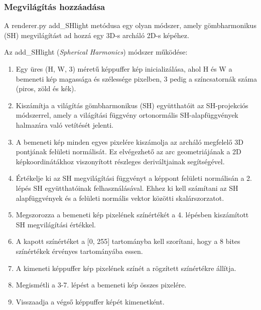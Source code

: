 \documentclass[12pt,a4]{article}
\begin{document}
\subsubsection{Megvilágítás hozzáadása}
A renderer.py add\_SHlight metódusa egy olyan módszer, amely gömbharmonikus (SH) megvilágítást ad hozzá egy 3D-s archáló 2D-s képéhez.

Az add\_SHlight (\textit{Spherical Harmonics}) módszer működése:

\begin{enumerate}
    \item Egy üres (H, W, 3) méretű képpuffer kép inicializálása, ahol H és W a bemeneti kép magassága és szélessége pixelben, 3 pedig a színcsatornák száma (piros, zöld és kék).

    \item Kiszámítja a világítás gömbharmonikus (SH) együtthatóit az SH-projekciós módszerrel, amely a világítási függvény ortonormális SH-alapfüggvények halmazára való vetítését jelenti.

    \item A bemeneti kép minden egyes pixelére kiszámolja az archáló megfelelő 3D pontjának felületi normálisát. Ez elvégezhető az arc geometriájának a 2D képkoordinátákhoz viszonyított részleges deriváltjainak segítségével.

    \item Értékelje ki az SH megvilágítási függvényt a képpont felületi normálisán a 2. lépés SH együtthatóinak felhasználásával. Ehhez ki kell számítani az SH alapfüggvények és a felületi normális vektor közötti skalárszorzatot.

    \item Megszorozza a bemeneti kép pixelének színértékét a 4. lépésben kiszámított SH megvilágítási értékkel.

    \item A kapott színértéket a [0, 255] tartományba kell szorítani, hogy a 8 bites színértékek érvényes tartományába essen.

    \item A kimeneti képpuffer kép pixelének színét a rögzített színértékre állítja.

    \item Megismétli a 3-7. lépést a bemeneti kép összes pixelére.

    \item Visszaadja a végső képpuffer képét kimenetként.

    
\end{enumerate}
\end{document}
